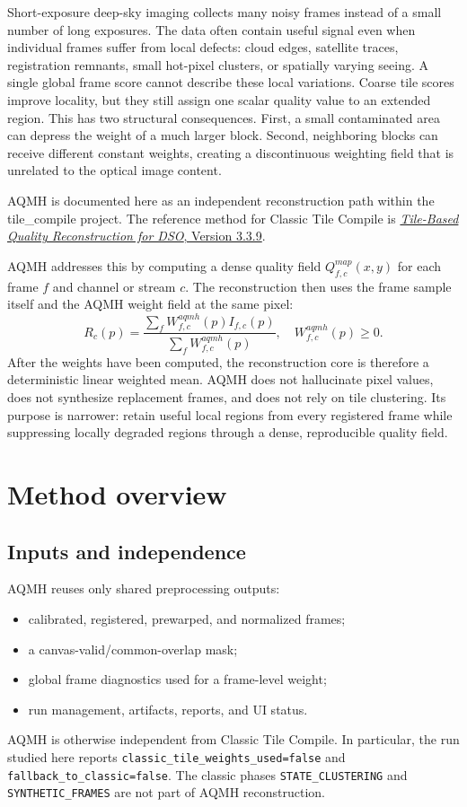 \documentclass[10pt,twocolumn]{article}
\begin{document}
Short-exposure deep-sky imaging collects many noisy frames instead of a small number of long
exposures. The data often contain useful signal even when individual frames suffer from local
defects: cloud edges, satellite traces, registration remnants, small hot-pixel clusters, or
spatially varying seeing. A single global frame score cannot describe these local variations.
Coarse tile scores improve locality, but they still assign one scalar quality value to an
extended region. This has two structural consequences. First, a small contaminated area can
depress the weight of a much larger block. Second, neighboring blocks can receive different
constant weights, creating a discontinuous weighting field that is unrelated to the optical
image content.

AQMH is documented here as an independent reconstruction path within the tile\_compile project.
The reference method for Classic Tile Compile is
\href{https://doi.org/10.5281/zenodo.19437794}{\emph{Tile-Based Quality Reconstruction for DSO},
Version 3.3.9}.

AQMH addresses this by computing a dense quality field
$Q_{f,c}^{map}(x,y)$ for each frame $f$ and channel or stream $c$. The reconstruction then uses
the frame sample itself and the AQMH weight field at the same pixel:
\begin{equation}
  R_c(p) =
  \frac{\sum_f W_{f,c}^{aqmh}(p) I_{f,c}(p)}
       {\sum_f W_{f,c}^{aqmh}(p)} ,
  \quad W_{f,c}^{aqmh}(p) \ge 0 .
\end{equation}
After the weights have been computed, the reconstruction core is therefore a deterministic linear
weighted mean. AQMH does not hallucinate pixel values, does not synthesize replacement frames, and
does not rely on tile clustering. Its purpose is narrower: retain useful local regions from every
registered frame while suppressing locally degraded regions through a dense, reproducible quality
field.

\section{Method overview}

\subsection{Inputs and independence}

AQMH reuses only shared preprocessing outputs:
\begin{itemize}
  \item calibrated, registered, prewarped, and normalized frames;
  \item a canvas-valid/common-overlap mask;
  \item global frame diagnostics used for a frame-level weight;
  \item run management, artifacts, reports, and UI status.
\end{itemize}
AQMH is otherwise independent from Classic Tile Compile. In particular, the run studied here
reports \texttt{classic\_tile\_weights\_used=false} and
\texttt{fallback\_to\_classic=false}. The classic phases \texttt{STATE\_CLUSTERING} and
\texttt{SYNTHETIC\_FRAMES} are not part of AQMH reconstruction.
\end{document}
